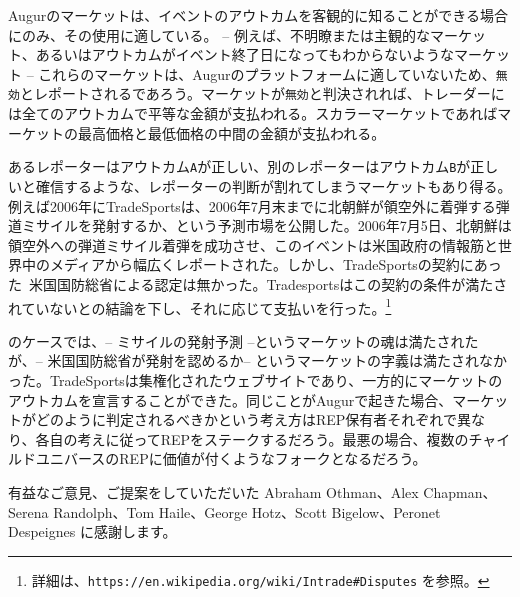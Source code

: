 \documentclass[floatfix,reprint,nofootinbib,amsmath,amssymb,epsfig,pre,floats,letterpaper,groupedaffiliation]{revtex4-1}
\theoremstyle{definition}
\theoremstyle{definition}
\theoremstyle{definition}
\begin{document}
Augurのマーケットは、イベントのアウトカムを客観的に知ることができる場合にのみ、その使用に適している。 -- 例えば、不明瞭または主観的なマーケット、あるいはアウトカムがイベント終了日になってもわからないようなマーケット -- これらのマーケットは、Augurのプラットフォームに適していないため、\texttt{無効}とレポートされるであろう。マーケットが\texttt{無効}と判決されれば、トレーダーには全てのアウトカムで平等な金額が支払われる。スカラーマーケットであればマーケットの最高価格と最低価格の中間の金額が支払われる。

あるレポーターはアウトカム\texttt{A}が正しい、別のレポーターはアウトカム\texttt{B}が正しいと確信するような、レポーターの判断が割れてしまうマーケットもあり得る。例えば2006年にTradeSportsは、2006年7月末までに北朝鮮が領空外に着弾する弾道ミサイルを発射するか、という予測市場を公開した。2006年7月5日、北朝鮮は領空外への弾道ミサイル着弾を成功させ、このイベントは米国政府の情報筋と世界中のメディアから幅広くレポートされた。しかし、TradeSportsの契約にあった~米国国防総省による認定は無かった。Tradesportsはこの契約の条件が満たされていないとの結論を下し、それに応じて支払いを行った。\footnote{詳細は、\texttt{https://en.wikipedia.org/wiki/Intrade\#Disputes} を参照。}

のケースでは、-- ミサイルの発射予測 --というマーケットの魂は満たされたが、-- 米国国防総省が発射を認めるか-- というマーケットの字義は満たされなかった。TradeSportsは集権化されたウェブサイトであり、一方的にマーケットのアウトカムを宣言することができた。同じことがAugurで起きた場合、マーケットがどのように判定されるべきかという考え方はREP保有者それぞれで異なり、各自の考えに従ってREPをステークするだろう。最悪の場合、複数のチャイルドユニバースのREPに価値が付くようなフォークとなるだろう。

\begin{acknowledgments}\label{section:acknowledgements}
有益なご意見、ご提案をしていただいた Abraham Othman、Alex Chapman、Serena Randolph、Tom Haile、George Hotz、Scott Bigelow、Peronet Despeignes に感謝します。
\end{acknowledgments}



\end{document}
